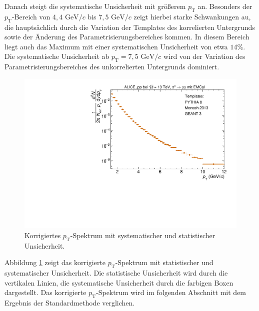 Danach steigt die systematische Unsicherheit mit größerem $p_\text{T}$ an.
Besonders der $p_\text{T}$-Bereich von $4,4 \text{ GeV}/c$ bis $7,5 \text{ GeV}/c$ zeigt hierbei starke Schwankungen au, die hauptsächlich durch die Variation der Templates des korrelierten Untergrunds sowie der Änderung des Parametrisierungsbereiches kommen.
In diesem Bereich liegt auch das Maximum mit einer systematischen Unsicherheit von etwa $14\%$.
Die systematische Unsicherheit ab $p_\text{T} = 7,5 \text{ GeV}/c$ wird von der Variation des Parametrisierungsbereiches des unkorrelierten Untergrunds dominiert.
\begin{figure}[t!]
\centering
\includegraphics[width=.65\linewidth]{KorrigierterYield_Data_2016.pdf}
\caption{Korrigiertes $p_\text{T}$-Spektrum mit systematischer und statistischer Unsicherheit.}
\label{fig:KorrYield}
\end{figure}
\newline
Abbildung \ref{fig:KorrYield} zeigt das korrigierte $p_\text{T}$-Spektrum mit statistischer und systematischer Unsicherheit.
Die statistische Unsicherheit wird durch die vertikalen Linien, die systematische Unsicherheit durch die farbigen Boxen dargestellt.
\newline
Das korrigierte $p_\text{T}$-Spektrum wird im folgenden Abschnitt mit dem Ergebnis der Standardmethode verglichen.